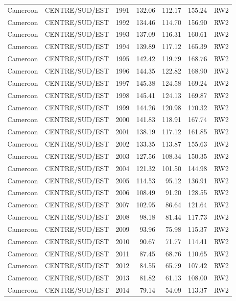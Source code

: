 \begin{longtable}{lllrrrl}
  Cameroon & CENTRE/SUD/EST & 1991 & 132.06 & 112.17 & 155.24 & RW2 \\ 
  Cameroon & CENTRE/SUD/EST & 1992 & 134.46 & 114.70 & 156.90 & RW2 \\ 
  Cameroon & CENTRE/SUD/EST & 1993 & 137.09 & 116.31 & 160.61 & RW2 \\ 
  Cameroon & CENTRE/SUD/EST & 1994 & 139.89 & 117.12 & 165.39 & RW2 \\ 
  Cameroon & CENTRE/SUD/EST & 1995 & 142.42 & 119.79 & 168.76 & RW2 \\ 
  Cameroon & CENTRE/SUD/EST & 1996 & 144.35 & 122.82 & 168.90 & RW2 \\ 
  Cameroon & CENTRE/SUD/EST & 1997 & 145.38 & 124.58 & 169.24 & RW2 \\ 
  Cameroon & CENTRE/SUD/EST & 1998 & 145.41 & 124.13 & 169.87 & RW2 \\ 
  Cameroon & CENTRE/SUD/EST & 1999 & 144.26 & 120.98 & 170.32 & RW2 \\ 
  Cameroon & CENTRE/SUD/EST & 2000 & 141.83 & 118.91 & 167.74 & RW2 \\ 
  Cameroon & CENTRE/SUD/EST & 2001 & 138.19 & 117.12 & 161.85 & RW2 \\ 
  Cameroon & CENTRE/SUD/EST & 2002 & 133.35 & 113.87 & 155.63 & RW2 \\ 
  Cameroon & CENTRE/SUD/EST & 2003 & 127.56 & 108.34 & 150.35 & RW2 \\ 
  Cameroon & CENTRE/SUD/EST & 2004 & 121.32 & 101.50 & 144.98 & RW2 \\ 
  Cameroon & CENTRE/SUD/EST & 2005 & 114.53 & 95.12 & 136.91 & RW2 \\ 
  Cameroon & CENTRE/SUD/EST & 2006 & 108.49 & 91.20 & 128.55 & RW2 \\ 
  Cameroon & CENTRE/SUD/EST & 2007 & 102.95 & 86.64 & 121.64 & RW2 \\ 
  Cameroon & CENTRE/SUD/EST & 2008 & 98.18 & 81.44 & 117.73 & RW2 \\ 
  Cameroon & CENTRE/SUD/EST & 2009 & 93.96 & 75.98 & 115.37 & RW2 \\ 
  Cameroon & CENTRE/SUD/EST & 2010 & 90.67 & 71.77 & 114.41 & RW2 \\ 
  Cameroon & CENTRE/SUD/EST & 2011 & 87.45 & 68.76 & 110.65 & RW2 \\ 
  Cameroon & CENTRE/SUD/EST & 2012 & 84.55 & 65.79 & 107.42 & RW2 \\ 
  Cameroon & CENTRE/SUD/EST & 2013 & 81.82 & 61.13 & 108.00 & RW2 \\ 
  Cameroon & CENTRE/SUD/EST & 2014 & 79.14 & 54.09 & 113.37 & RW2 \\ 

\end{longtable}
